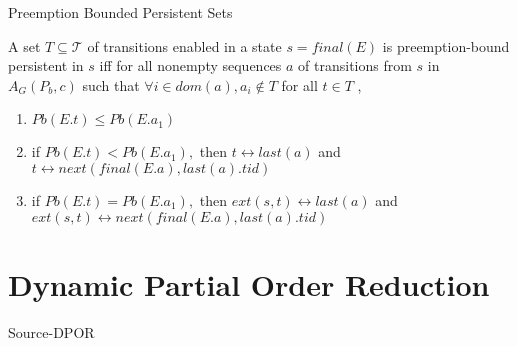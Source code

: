 \documentclass[9pt]{beamer}
\begin{document}
\begin{frame}{Preemption Bounded Persistent Sets}

\begin{definition}

A set $T \subseteq \mathcal{T}$ of transitions enabled in a state $s=final(E)$
is preemption-bound persistent in $s$ iff for all nonempty
sequences $a$ of transitions from $s$ in $A_G(P_b,c)$ such that
$\forall i \in dom(a), a_i \notin T$ for all $t \in T$ ,

\begin{enumerate}
\item $Pb(E.t) \leq Pb(E.a_1)$
\item if $Pb(E.t)<Pb(E.a_{1}) ,$ then $t \leftrightarrow last(a)$ and $t \leftrightarrow  next(final(E.a), last(a).tid)$
\item if $Pb(E.t)=Pb(E.a_{1}),$ then $ext(s,t) \leftrightarrow last(a)$ and $ext(s,t) \leftrightarrow next(final(E.a), last(a).tid)$
\end{enumerate}

\end{definition}
    
\end{frame}

\section{Dynamic Partial Order Reduction}

\begin{frame}{Source-DPOR}

\begin{figure}
    
\end{figure}

\end{frame}
\end{document}
